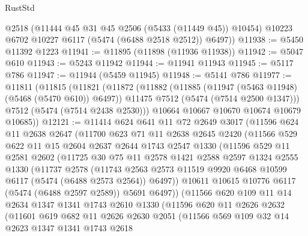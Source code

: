 \begin{lexlean}{RustStd}
\begin{coremodule}
        @2518
        (@11444 @45 @31 @45 @2506 (@5433 (@11449 @45)) @10454)
        @10223
        @6702
        @10227
        @6117
        (@5474 (@6488 @2518 @2512))
        @6497))
@11938 := @5450 @11392 @1223
@11941 := @11895 (@11898 (@11936 @11938))
@11942 := @5047 @610
@11943 := @5243 @11942
@11944 := @11941 @11943
@11945 := @5117 @786
@11947 := @11944 (@5459 @11945)
@11948 := @5141 @786
@11977 := @11811
    (@11815
      (@11821
        (@11872
          (@11882
            (@11885 (@11947 (@5463 @11948) (@5468 (@5470 @610)) @6497))
            @11475
            @7512
            (@5474 (@7514 @2500 @1347)))
          @7512
          (@5474 (@7514 @2438 @2530)))
        @10664
        @10667
        @10670
        @10674
        @10679
        @10685))
@12121 := @11414
    @624
    @641
    @11
    @72
    @2649
    @3017
    (@11596
      @624
      @11
      @2638
      @2647
      (@11700
        @623
        @71
        @11
        @2638
        @2645
        @2420
        (@11566
          @529
          @622
          @11
          @15
          @2604
          @2637
          @2644
          @1743
          @2547
          @1330
          (@11596
            @529
            @11
            @2581
            @2602
            (@11725
              @30
              @75
              @11
              @2578
              @1421
              @2588
              @2597
              @1324
              @2555
              @1330
              (@11737
                @2578
                (@11743
                  @2563
                  @2573
                  @11519
                  @9920
                  @6468
                  @10599
                  @6117
                  (@5474 (@6488 @2573 @2564))
                  @6497))
              @10611
              @10615
              @10776
              @6117
              (@5474 (@6488 @2597 @2589))
              @5691
              @6497))
          (@11566
            @620
            @109
            @11
            @14
            @2634
            @1347
            @1341
            @1743
            @2610
            @1330
            (@11596
              @620
              @11
              @2626
              @2632
              (@11601
                @619
                @682
                @11
                @2626
                @2630
                @2051
                (@11566
                  @569
                  @109
                  @32
                  @14
                  @2623
                  @1347
                  @1341
                  @1743
                  @2618

\end{coremodule}
\end{lexlean}
